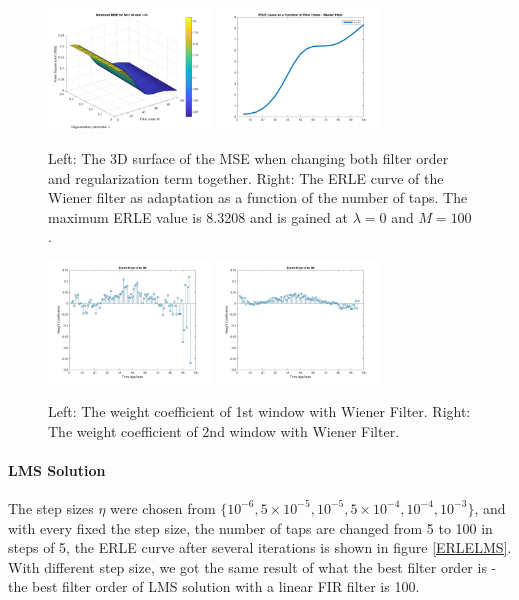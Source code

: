 \documentclass[conference]{IEEEtran}
\begin{document}
	\begin{figure}[htbp]
	\centering
	\includegraphics[width = 1.7in]{Wiener2paracom.jpg}
	\includegraphics[width=1.7in]{WienerERLE.jpg}
	\caption{Left: The 3D surface of the MSE when changing both filter order and regularization term together. Right: The ERLE curve of the Wiener filter as adaptation as a function of the 	number of taps. The maximum ERLE value is 8.3208 and is gained at $\lambda = 0$ and $M = 100$.}
	\label{fig1}
	\end{figure}


	\begin{figure}[htbp]
	\centering
	\includegraphics[width = 1.7in]{Wiener_w1_weight_zoom.jpg}
	\includegraphics[width=1.7in]{Wiener_w2_weight_zoom.jpg}
	\caption{Left: The weight coefficient of 1st window with Wiener Filter. Right: The weight coefficient of 2nd window with Wiener Filter.}
	\label{fig2}
	\end{figure}


		\paragraph{LMS Solution} The step sizes $\eta$ were chosen from $\{{10^{-6}, 5\times 10^{-5}, 10^{-5}, 5\times 10^{-4},10^{-4}, 10^{-3}}\}$, and with every fixed the step size, the number of taps are changed from 5 to 100 in steps of 5, the ERLE curve after several iterations is shown in figure \ref{ERLELMS}. With different step size, we got the same result of what the best filter order is - the best filter order of LMS solution with a linear FIR filter is 100. 
	
\end{document}
